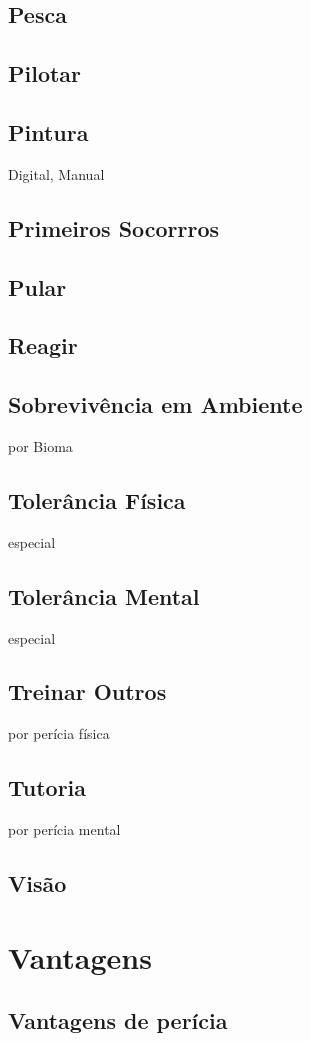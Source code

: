 \section{Pesca}
\section{Pilotar}
\section{Pintura} Digital, Manual
\section{Primeiros Socorrros}
\section{Pular}
\section{Reagir}
\section{Sobrevivência em Ambiente} por Bioma
\section{Tolerância Física} especial
\section{Tolerância Mental} especial
\section{Treinar Outros} por perícia física
\section{Tutoria} por perícia mental
\section{Visão}
%
%
%
%
%
\chapter{Vantagens}
%
%
\section{Vantagens de perícia}
%
%
